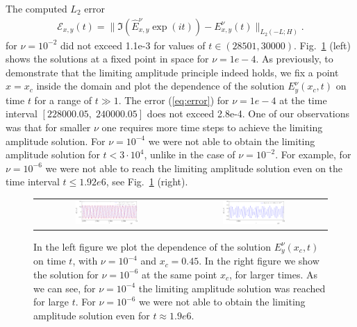 \FloatBarrier
The computed $L_2$ error
\begin{align}
\label{eq:error}
\mathcal{E}_{x,y}(t)=\|\Im\left(\hat{E}_{x,y}^{\nu}\exp(it)\right)-E_{x,y}^{\nu}(t)\|_{L_{2}(-L;H)}.
\end{align}
for $\nu=10^{-2}$ did not exceed 1.1e-3 for values of $t\in \left(28501,  30000\right)$. Fig.~\ref{fig:nu1e4_harmon} (left) shows the solutions at a fixed point in space for $\nu=1e-4$. As previously, 
to demonstrate that the limiting amplitude principle indeed holds, we fix a point $x=x_c$ 
inside the domain and plot 
the dependence of the solution $E_{y}^{\nu}(x_c,t)$ on time $t$ for a range of $t\gg 1$. 
The error (\ref{eq:error}) for $\nu=1e-4$ at the time interval $[228000.05,\; 240000.05]$ does not exceed 2.8e-4. 
One of our observations was that for smaller $\nu$ one requires more time steps to achieve the limiting amplitude solution. 
For $\nu=10^{-4}$ we were not able to obtain the limiting amplitude solution for $t<3\cdot 10^{4}$, unlike in the case of $\nu=10^{-2}$. 
For example, for $\nu=10^{-6}$ we were not able to reach the limiting amplitude solution even on the time interval $t\leq 1.92e6$, 
see Fig.~\ref{fig:nu1e4_harmon} (right). 
\begin{figure}
\begin{tabular}{cc}
 \includegraphics[width=0.45\textwidth]{airy/figure_nu1e4-crop.pdf}&
 \includegraphics[width=0.45\textwidth]{airy/figure_nu1e6-crop.pdf}\\
\end{tabular}
\caption{In the left figure we plot the dependence of the solution $E_{y}^{\nu}(x_c,t)$ on time $t$, with $\nu=10^{-4}$ and $x_c=0.45$. 
In the right figure we show the solution for $\nu=10^{-6}$ at the same point $x_c$, for larger times. As we can see, for 
$\nu=10^{-4}$ the limiting amplitude solution was reached for large $t$. For $\nu=10^{-6}$ we were not able 
to obtain the limiting amplitude solution even for $t\approx 1.9e6$. }
  \label{fig:nu1e4_harmon}
\end{figure}

